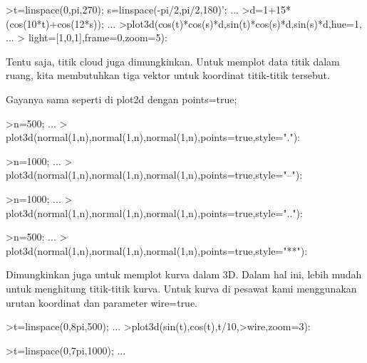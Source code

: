 \documentclass[a4paper,10pt]{article}
\begin{document}
\begin{eulernotebook}
\begin{eulercomment}
\begin{eulercomment}
\begin{eulerprompt}
>t=linspace(0,pi,270); s=linspace(-pi/2,pi/2,180)'; ...
>d=1+15*(cos(10*t)+cos(12*s)); ...
>plot3d(cos(t)*cos(s)*d,sin(t)*cos(s)*d,sin(s)*d,hue=1, ...
>  light=[1,0,1],frame=0,zoom=5):
\end{eulerprompt}
\begin{eulercomment}
Tentu saja, titik cloud juga dimungkinkan. Untuk memplot data titik
dalam ruang, kita membutuhkan tiga vektor untuk koordinat titik-titik
tersebut.

Gayanya sama seperti di plot2d dengan points=true;
\end{eulercomment}
\begin{eulerprompt}
>n=500;  ...
>  plot3d(normal(1,n),normal(1,n),normal(1,n),points=true,style="."):
\end{eulerprompt}
\begin{eulerprompt}
>n=1000;  ...
>  plot3d(normal(1,n),normal(1,n),normal(1,n),points=true,style="--"):
\end{eulerprompt}
\begin{eulerprompt}
>n=1000;  ...
>  plot3d(normal(1,n),normal(1,n),normal(1,n),points=true,style=".."):
\end{eulerprompt}
\begin{eulerprompt}
>n=500;  ...
>  plot3d(normal(1,n),normal(1,n),normal(1,n),points=true,style="**"):
\end{eulerprompt}
\begin{eulercomment}
Dimungkinkan juga untuk memplot kurva dalam 3D. Dalam hal ini, lebih
mudah untuk menghitung titik-titik kurva. Untuk kurva di pesawat kami
menggunakan urutan koordinat dan parameter wire=true.
\end{eulercomment}
\begin{eulerprompt}
>t=linspace(0,8pi,500); ...
>plot3d(sin(t),cos(t),t/10,>wire,zoom=3):
\end{eulerprompt}
\begin{eulerprompt}
>t=linspace(0,7pi,1000); ...

\end{eulerprompt}
\end{eulercomment}
\end{eulercomment}
\end{eulernotebook}
\end{document}
